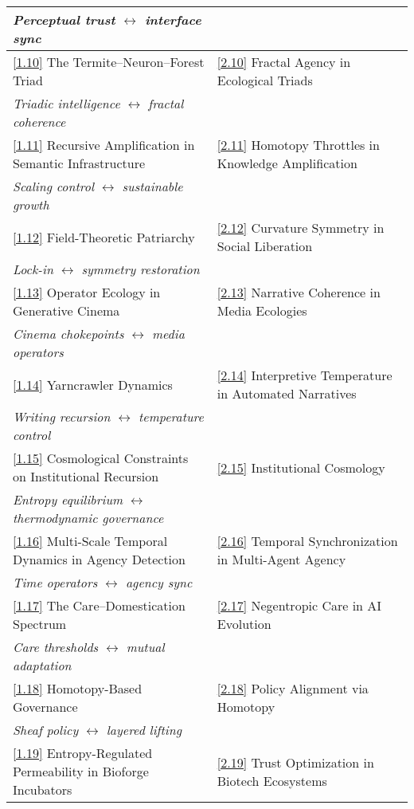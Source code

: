 \documentclass[12pt,a4paper]{article}
\newcommand{\essayref}[2]{\hyperref[sec:essay#1-#2]{[#1.#2]}}
\begin{document}
\begin{table}[ht]
\begin{tabular}{@{}p{}p{}@{}}
\emph{Perceptual trust} $\leftrightarrow$ \emph{interface sync} & \\
\midrule
\essayref{1}{10} The Termite--Neuron--Forest Triad & \essayref{2}{10} Fractal Agency in Ecological Triads \\
\emph{Triadic intelligence} $\leftrightarrow$ \emph{fractal coherence} & \\
\midrule
\essayref{1}{11} Recursive Amplification in Semantic Infrastructure & \essayref{2}{11} Homotopy Throttles in Knowledge Amplification \\
\emph{Scaling control} $\leftrightarrow$ \emph{sustainable growth} & \\
\midrule
\essayref{1}{12} Field-Theoretic Patriarchy & \essayref{2}{12} Curvature Symmetry in Social Liberation \\
\emph{Lock-in} $\leftrightarrow$ \emph{symmetry restoration} & \\
\midrule
\essayref{1}{13} Operator Ecology in Generative Cinema & \essayref{2}{13} Narrative Coherence in Media Ecologies \\
\emph{Cinema chokepoints} $\leftrightarrow$ \emph{media operators} & \\
\midrule
\essayref{1}{14} Yarncrawler Dynamics & \essayref{2}{14} Interpretive Temperature in Automated Narratives \\
\emph{Writing recursion} $\leftrightarrow$ \emph{temperature control} & \\
\midrule
\essayref{1}{15} Cosmological Constraints on Institutional Recursion & \essayref{2}{15} Institutional Cosmology \\
\emph{Entropy equilibrium} $\leftrightarrow$ \emph{thermodynamic governance} & \\
\midrule
\essayref{1}{16} Multi-Scale Temporal Dynamics in Agency Detection & \essayref{2}{16} Temporal Synchronization in Multi-Agent Agency \\
\emph{Time operators} $\leftrightarrow$ \emph{agency sync} & \\
\midrule
\essayref{1}{17} The Care--Domestication Spectrum & \essayref{2}{17} Negentropic Care in AI Evolution \\
\emph{Care thresholds} $\leftrightarrow$ \emph{mutual adaptation} & \\
\midrule
\essayref{1}{18} Homotopy-Based Governance & \essayref{2}{18} Policy Alignment via Homotopy \\
\emph{Sheaf policy} $\leftrightarrow$ \emph{layered lifting} & \\
\midrule
\essayref{1}{19} Entropy-Regulated Permeability in Bioforge Incubators & \essayref{2}{19} Trust Optimization in Biotech Ecosystems \\

\end{tabular}
\end{table}
\end{document}
